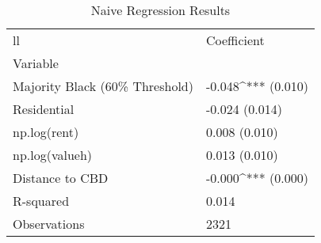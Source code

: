 \begin{table}[h]
\centering
\caption{Naive Regression Results}
\label{tab:naive_results}
\begin{tabularx}{0.7\textwidth}{X|X}{ll}
\toprule
 & Coefficient \\
Variable &  \\
\midrule
Majority Black (60\% Threshold) & -0.048^{***}
(0.010) \\
Residential & -0.024
(0.014) \\
np.log(rent) & 0.008
(0.010) \\
np.log(valueh) & 0.013
(0.010) \\
Distance to CBD & -0.000^{***}
(0.000) \\
R-squared & 0.014 \\
Observations & 2321 \\
\bottomrule
\end{tabularx}
\end{table}
